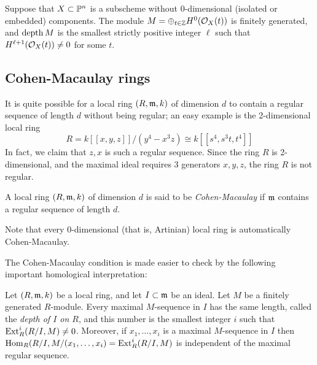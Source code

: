 \begin{theorem} Suppose that $X\subset {\mathbb P}^{n}$ is a  subscheme without 0-dimensional (isolated or embedded) components. The module $M = \oplus_{t\in {\mathbb Z}}H^{0}({\mathcal O}_{X}(t))$
is finitely generated, and $\operatorname{depth} M$ is the smallest strictly positive integer $\ell$ such that 
$H^{\ell+1}({\mathcal O}_{X}(t)) \neq 0$  for some $t$.
\end{theorem}



 \subsection{Cohen-Macaulay rings}

 It is quite possible for a local ring $(R,\mathfrak m, k)$ of dimension $d$ to contain a regular sequence of length $d$
 without being regular; an easy example is the 2-dimensional local ring
 $$
 R = k[[x,y, z]]/(y^{4}-x^{3}z) \cong k[[s^{4}, s^{3}t, t^{4}]]
 $$
In fact, we claim that $z,x$ is such a regular sequence. Since the ring $R$ is 2-dimensional, and the maximal ideal requires 3 generators $x,y,z$, the ring $R$ is not regular. 

\begin{definition}
A local ring $(R,\mathfrak m,k)$ of dimension $d$ is said to be \emph{Cohen-Macaulay}  if $\mathfrak m$ contains a regular sequence of length $d$.
\end{definition}
 Note that every 0-dimensional (that is, Artinian) local ring is automatically Cohen-Macaulay.
 
The Cohen-Macaulay condition is made easier to check by the following important homological interpretation:

\begin{theorem}\label{depth}
Let $(R,\mathfrak m, k)$ be a local ring, and let $I\subset \mathfrak m$ be an ideal. 
Let $M$ be a finitely generated 
 $R$-module. Every maximal $M$-sequence in $I$ has the same length, called the \emph{depth of $I$ on $R$}, and this number is the smallest integer $i$ such that
 ${\rm{Ext}}^{i}_{R}(R/I, M)\neq 0$. Moreover, if $x_{1}, \dots, x_{i}$ is a maximal $M$-sequence
 in $I$ then $\operatorname{Hom}_{R}(R/I, M/(x_{1}, \dots, x_{i})= {\rm{Ext}}^{i}_{R}(R/I, M)$ is independent of the maximal regular sequence.
\end{theorem}
 
